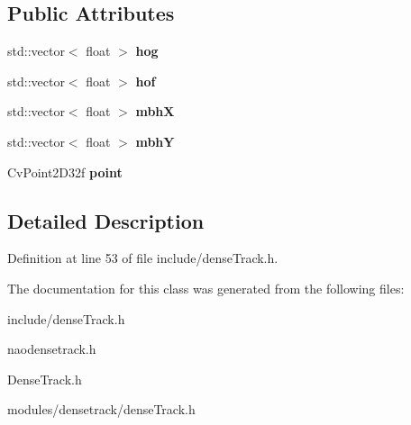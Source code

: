 \subsection*{Public Attributes}
\begin{DoxyCompactItemize}
\item 
\hypertarget{class_point_desc_ae8900cd4715ff7a97e29e875edad9c67}{
std::vector$<$ float $>$ {\bfseries hog}}
\label{class_point_desc_ae8900cd4715ff7a97e29e875edad9c67}

\item 
\hypertarget{class_point_desc_a7956a580ba405ecfd312bbb59b245383}{
std::vector$<$ float $>$ {\bfseries hof}}
\label{class_point_desc_a7956a580ba405ecfd312bbb59b245383}

\item 
\hypertarget{class_point_desc_a2ff416ed9cbd380537c93eaf1c88fecc}{
std::vector$<$ float $>$ {\bfseries mbhX}}
\label{class_point_desc_a2ff416ed9cbd380537c93eaf1c88fecc}

\item 
\hypertarget{class_point_desc_a2e01fddc7d81200c1094f00e3653a887}{
std::vector$<$ float $>$ {\bfseries mbhY}}
\label{class_point_desc_a2e01fddc7d81200c1094f00e3653a887}

\item 
\hypertarget{class_point_desc_ab8af764d76bca21655414d29b8edf00f}{
CvPoint2D32f {\bfseries point}}
\label{class_point_desc_ab8af764d76bca21655414d29b8edf00f}

\end{DoxyCompactItemize}


\subsection{Detailed Description}


Definition at line 53 of file include/denseTrack.h.



The documentation for this class was generated from the following files:\begin{DoxyCompactItemize}
\item 
include/denseTrack.h\item 
naodensetrack.h\item 
DenseTrack.h\item 
modules/densetrack/denseTrack.h\end{DoxyCompactItemize}
